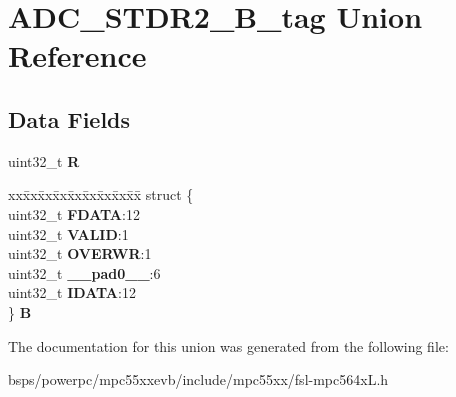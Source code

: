 \hypertarget{unionADC__STDR2__32B__tag}{}\section{A\+D\+C\+\_\+\+S\+T\+D\+R2\+\_\+B\+\_\+tag Union Reference}
\label{unionADC__STDR2__32B__tag}
\subsection*{Data Fields}
\begin{DoxyCompactItemize}
\item 
\mbox{\label{unionADC__STDR2__32B__tag_a0f50163cf076194dd7e39eb4450803c3}} 
uint32\+\_\+t {\bfseries R}
\item 
\mbox{\label{unionADC__STDR2__32B__tag_a9a9ec101b385a46a3f3581cdfdd5cc40}} 
\begin{tabbing}
xx\=xx\=xx\=xx\=xx\=xx\=xx\=xx\=xx\=\kill
struct \{\\
\>uint32\_t {\bfseries FDATA}:12\\
\>uint32\_t {\bfseries VALID}:1\\
\>uint32\_t {\bfseries OVERWR}:1\\
\>uint32\_t {\bfseries \_\_pad0\_\_}:6\\
\>uint32\_t {\bfseries IDATA}:12\\
\} {\bfseries B}\\

\end{tabbing}\end{DoxyCompactItemize}


The documentation for this union was generated from the following file\+:\begin{DoxyCompactItemize}
\item 
bsps/powerpc/mpc55xxevb/include/mpc55xx/fsl-\/mpc564x\+L.\+h\end{DoxyCompactItemize}
